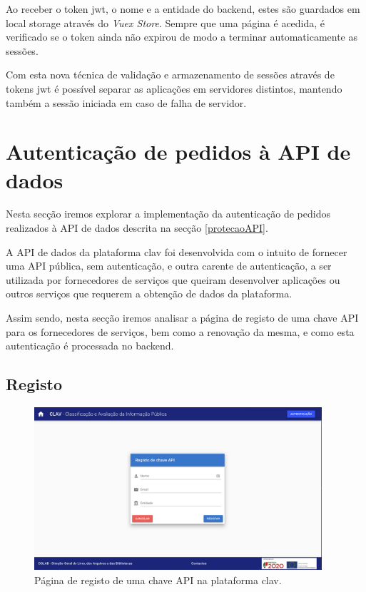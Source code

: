 Ao receber o token \gls{jwt}, o nome e a entidade do backend, estes são guardados em local storage através do \emph{Vuex Store}. Sempre que uma página é acedida, é verificado se o token ainda não expirou de modo a terminar automaticamente as sessões.

Com esta nova técnica de validação e armazenamento de sessões através de tokens \gls{jwt} é possível separar as aplicações em servidores distintos, mantendo também a sessão iniciada em caso de falha de servidor.

\cleardoublepage
\section{Autenticação de pedidos à API de dados}

Nesta secção iremos explorar a implementação da autenticação de pedidos realizados à API de dados descrita na secção \ref{protecaoAPI}.

A API de dados da plataforma \gls{clav} foi desenvolvida com o intuito de fornecer uma API pública, sem autenticação, e outra carente de autenticação, a ser utilizada por fornecedores de serviços que queiram desenvolver aplicações ou outros serviços que requerem a obtenção de dados da plataforma.

Assim sendo, nesta secção iremos analisar a página de registo de uma chave API para os fornecedores de serviços, bem como a renovação da mesma, e como esta autenticação é processada no backend.

\subsection{Registo} \label{registoChaveApi}
\begin{figure}[H]
    \centering
    \includegraphics[width=0.95\textwidth]{img/clav/authAPI/registar.png}
    \caption{Página de registo de uma chave API na plataforma \gls{clav}.}
    \label{fig:registoChaveAPI}
\end{figure}

